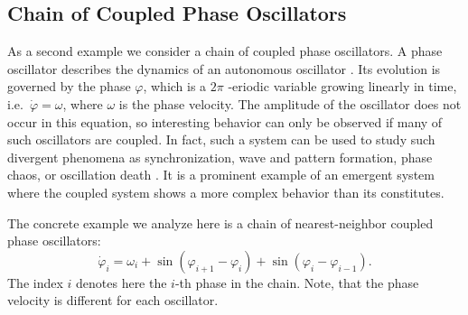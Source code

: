 \documentclass[final]{siamltex}
\begin{document}
%
%
\subsection{Chain of Coupled Phase Oscillators}

As a second example we consider a chain of coupled phase
oscillators. A phase oscillator describes the dynamics of an
autonomous oscillator \cite{PhaseOscillator}. Its evolution is
governed by the phase $\varphi$, which is a $2\pi$ -eriodic variable growing linearly
in time, i.e.~$\dot{\varphi} = \omega$, where $\omega$ is the phase
velocity. The amplitude of the oscillator does not occur in this
equation, so interesting behavior can only be observed if many
of such oscillators are coupled. In fact, such a system can be used to
study such divergent phenomena as synchronization, wave and pattern
formation, phase chaos, or oscillation death
\cite{Synchronization-Pikovsky,Kuramoto-84}. It is a prominent example
of an emergent system where the coupled system shows a more complex
behavior than its constitutes.


The concrete example we analyze here is a chain of nearest-neighbor
coupled phase oscillators:
\begin{equation} \label{eq:phasesystem}
    \dot{\varphi}_i = \omega_i + \sin( \varphi_{i+1} - \varphi_i) + \sin( \varphi_i
    - \varphi_{i-1}).
\end{equation}
The index $i$ denotes here the $i$-th phase in the chain. Note, that
the phase velocity is different for each oscillator.
\end{document}
